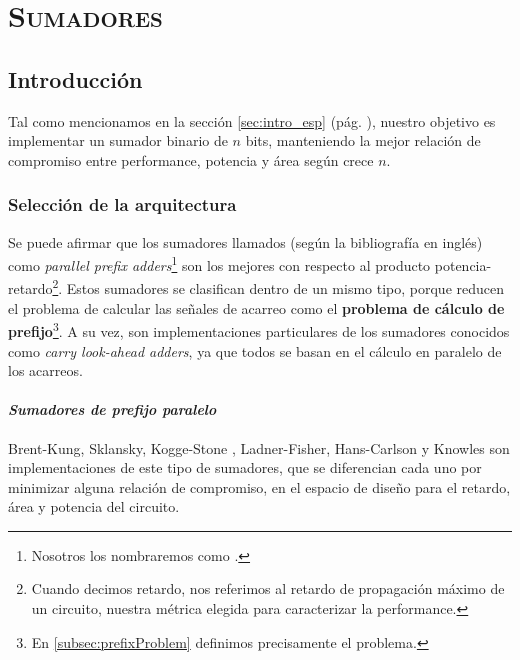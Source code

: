 



\chapter{ \textsc{ Sumadores } }\label{diseñoDigital}
	
\section{Introducción}
Tal como mencionamos en la sección \ref{sec:intro_esp} (pág. \pageref{sec:intro_esp}), nuestro objetivo es implementar un sumador binario de $n$ bits, manteniendo la mejor relación de compromiso entre performance, potencia y área según crece \(n\).


\subsection{Selección de la arquitectura}\label{sec:selección_arquitectura}

Se puede afirmar que los sumadores llamados (según la bibliografía en inglés) como \emph{parallel prefix adders}\footnote{Nosotros los nombraremos como .} son los mejores con respecto al producto potencia-retardo\footnote{Cuando decimos retardo, nos referimos al retardo de propagación máximo de un circuito, nuestra métrica elegida para caracterizar la performance.}.  Estos sumadores se clasifican dentro de un mismo tipo, porque reducen el problema de calcular las señales de acarreo como el \textbf{problema de cálculo de prefijo}\footnote{En \ref{subsec:prefixProblem} definimos precisamente el problema.}. A su vez, son implementaciones particulares de los sumadores  conocidos como \emph{carry look-ahead adders}, ya que todos se basan en el cálculo en paralelo de los acarreos.
\subsubsection{\emph{Sumadores de prefijo paralelo}}
Brent-Kung\cite{brent-kung}, Sklansky\cite{sklansky}, Kogge-Stone \cite{kogge-stone}, Ladner-Fisher\cite{ladner-fischer}, Hans-Carlson\cite{hans-carlson} y Knowles\cite{knowles} son implementaciones de este tipo de sumadores, que se diferencian cada uno por minimizar alguna relación de compromiso, en el espacio de diseño para el retardo, área y potencia\cite{Sugla-Carlson} del circuito.

